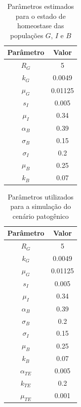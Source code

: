 \begin{table}[h]
    \centering
    \begin{tabular}{c c }
         \toprule
         Parâmetro & Valor \\
         \hline
         $R_G$ & 5  \\
         $k_G$ & 0.0049\\
         $\mu_G$ &  0.01125\\
         $s_I$ & 0.005\\
         $\mu_I$ &  0.34\\
         $\alpha_B$ & 0.39\\
         $\sigma_B$ & 0.15\\
         $\sigma_I$ & 0.2\\
         $\mu_B$ & 0.25\\
         $k_B$ & 0.07\\
         \bottomrule
    \end{tabular}
    \caption{Parâmetros estimados para o estado de homeostase das populações $G$, $I$ e $B$ }
    \label{tab_homeostaseGIB}
\end{table}

\begin{table}[h]
    \centering
    \begin{tabular}{c c}
         \toprule
         Parâmetro & Valor \\
         \midrule
         $R_G$ & 5  \\
         $k_G$ & 0.0049\\
         $\mu_G$ &  0.01125\\
         $s_I$ & 0.005\\
         $\mu_I$ &  0.34\\
         $\alpha_B$ & 0.39\\
         $\sigma_B$ & 0.2\\
         $\sigma_I$ & 0.15\\
         $\mu_B$ & 0.25\\
         $k_B$ & 0.07\\
         $\alpha_{TE}$ & 0.005\\
         $k_{TE}$ & 0.2\\
         $\mu_{TE}$ & 0.001\\
         \bottomrule
    \end{tabular}
    \caption{Parâmetros utilizados para a simulação do cenário patogênico}
    \label{tabParamsCenarioPatogenico}
\end{table}


